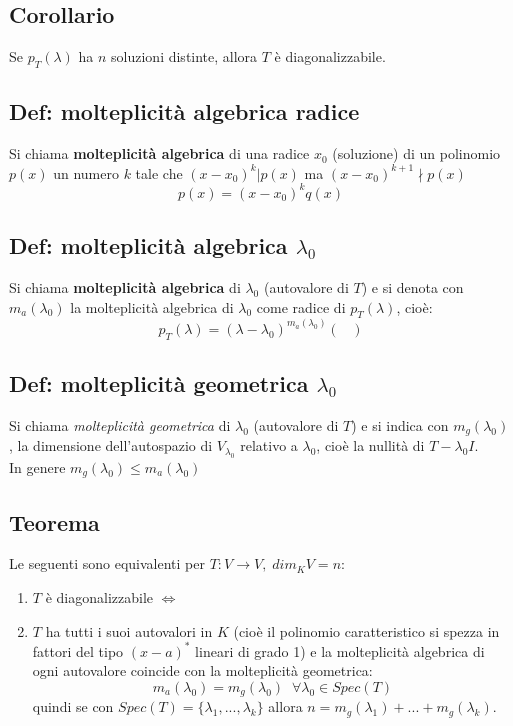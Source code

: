 \subsection{Corollario}
Se $p_T(\lambda)$ ha $n$ soluzioni distinte, allora $T$ è diagonalizzabile.

\subsection{Def: molteplicità algebrica radice}
Si chiama \textbf{molteplicità algebrica} di una radice $x_0$ (soluzione) di un polinomio $p(x)$ un numero $k$ tale che $(x-x_0)^k|p(x)$ ma $(x-x_0)^{k+1}\nmid p(x)$
  \[p(x)=(x-x_0)^kq(x)\]

\subsection{Def: molteplicità algebrica $\lambda_0$}  
Si chiama \textbf{molteplicità algebrica} di $\lambda_0$ (autovalore di $T$) e si denota con $m_a(\lambda_0)$ la molteplicità algebrica di $\lambda_0$ come radice di $p_T(\lambda)$, cioè:
  \[p_T(\lambda)=(\lambda -\lambda_0)^{m_a(\lambda_0)}(\;\;\;)\]

\subsection{Def: molteplicità geometrica $\lambda_0$}
Si chiama \textit{molteplicità geometrica} di $\lambda_0$ (autovalore di $T$) e si indica con $m_g(\lambda_0)$, la dimensione dell'autospazio di $V_{\lambda_0}$ relativo a $\lambda_0$, cioè la nullità di $T-\lambda_0 I$.
  \\In genere $m_g(\lambda_0)\leq m_a(\lambda_0)$

\subsection{Teorema}
Le seguenti sono equivalenti per $T:V\rightarrow V, \; dim_KV=n$:
\begin{enumerate}
\item $T$ è diagonalizzabile $\Leftrightarrow $

\item $T$ ha tutti i suoi autovalori in $K$ (cioè il polinomio caratteristico si spezza in fattori del tipo $(x-a)^*$ lineari di grado 1) e la molteplicità algebrica di ogni autovalore coincide con la molteplicità geometrica:
  \[m_a(\lambda_0)=m_g(\lambda_0)\;\;\forall\lambda_0\in Spec(T)\]
  quindi se con $Spec(T)=\{\lambda_1,...,\lambda_k\}$ allora $n=m_g(\lambda_1)+...+m_g(\lambda_k)$.

\end{enumerate}
